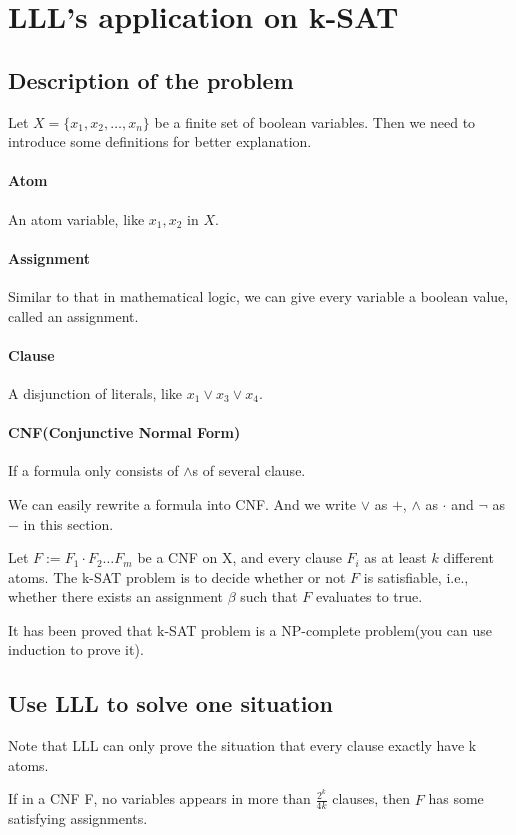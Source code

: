     
\section{LLL's application on k-SAT}
\subsection{Description of the problem}
Let $X = \{x_1,x_2,\dots,x_n\}$ be a finite set of boolean variables.
Then we need to introduce some definitions for better explanation.
\paragraph{Atom} An atom variable, like $x_1,x_2$ in $X$.
\paragraph{Assignment} Similar to that in mathematical logic, we can give every variable a boolean value, called an assignment. 
\paragraph{Clause} A disjunction of literals, like $x_1 \vee x_3 \vee x_4$.

\paragraph{CNF(Conjunctive Normal Form)} If a formula only consists of $\land$s of several clause.

We can easily rewrite a formula into CNF. And we write $\vee$ as $+$, $\land$ as $\cdot$ and $\neg$ as $-$ in this section.

Let $F := F_1 \cdot F_2 \dots F_m$ be a CNF on X, and every clause $F_i$ as at least $k$ different atoms. The k-SAT problem is to decide whether or not $F$ is satisfiable, i.e., whether there exists an assignment $\beta$ such that $F$ evaluates to true.

It has been proved that k-SAT problem is a NP-complete problem(you can use induction to prove it).


\subsection{Use LLL to solve one situation}
Note that LLL can only prove the situation that every clause exactly have k atoms.

\begin{theorem}
  If in a CNF F, no variables appears in more than $\frac{2^k}{4k}$ clauses,  then $F$ has some satisfying assignments.
\end{theorem}

